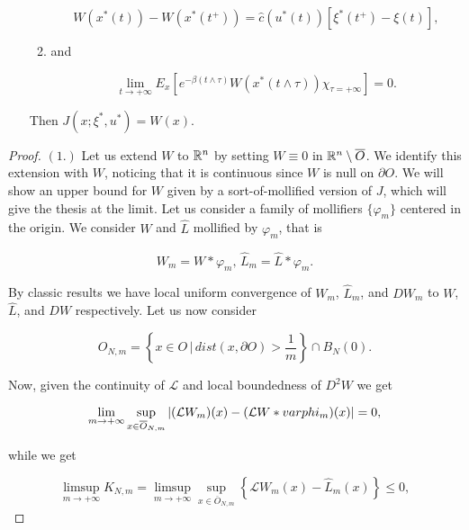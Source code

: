 \begin{theorem}
\begin{enumerate}[label=(\arabic*.)]
\begin{enumerate}[label=(2.\alph*.)]
            \[W(x^{\ast}(t)) - W(x^{\ast}(t^+)) = \hat{c}(u^{\ast}(t))\left[\xi^{\ast}(t^+) - \xi(t)\right],\]
            
            \item \label{4-2: fourth} and 
            
            \[\lim_{t\to+\infty} E_x\left[e^{-\beta(t\land\tau)}W(x^{\ast}(t\land\tau))\chi_{\tau=+\infty}\right] = 0.\]
        \end{enumerate}

        Then $J(x;\xi^{\ast},u^{\ast}) = W(x)$.
    \end{enumerate}

    \begin{proof}
        $(\textit{1}.)$ Let us extend $W$ to $\mathbb{R}^n$ by setting $W\equiv0$ in $\mathbb{R}^n\setminus \overline{O}$. We identify this extension with $W$, noticing that it is continuous since $W$ is null on $\partial O$. We will show an upper bound for $W$ given by a sort-of-mollified version of $J$, which will give the thesis at the limit. Let us consider a family of mollifiers $\{\varphi_m\}$ centered in the origin. We consider $W$ and $\hat{L}$ mollified by $\varphi_m$, that is 
        
        \begin{equation}
            W_m = W \ast \varphi_m,\, \hat{L}_m = \hat{L} \ast \varphi_m.
        \end{equation}

        By classic results we have local uniform convergence of $W_m$, $\hat{L}_m$, and $DW_m$ to $W$, $\hat{L}$, and $DW$ respectively. Let us now consider
        
        \begin{equation}
            O_{N,m} = \left\{x\in O \,|\, dist(x,\partial O) > \frac{1}{m}\right\} \cap B_N(0).
        \end{equation}

        Now, given the continuity of $\mathcal{L}$ and local boundedness of $D^2W$ we get
        
        \begin{equation*}
            \lim_{m\to+\infty} \sup_{x\in\overline{O}_{N,m}} \abs{(\mathcal{L}W_m)(x) - (\mathcal{L}W\ast varphi_m)(x)} = 0,
        \end{equation*}

        while we get

        \begin{equation*}
            \limsup_{m\to+\infty} K_{N,m} = \limsup_{m\to+\infty}\sup_{x\in\overline{O}_{N,m}}\left\{\mathcal{L}W_m(x) - \hat{L}_m(x)\right\}\leq 0,
        \end{equation*}
        

\end{proof}
\end{theorem}
